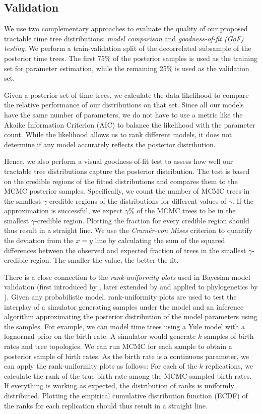 \documentclass[10pt,letterpaper]{article}
\begin{document}
\subsection*{Validation}

We use two complementary approaches to evaluate the quality of our proposed tractable time tree distributions: \emph{model comparison} and \emph{goodness-of-fit (GoF) testing}. We perform a train-validation split of the decorrelated subsample of the posterior time trees. The first 75\% of the posterior samples is used as the training set for parameter estimation, while the remaining 25\% is used as the validation set.

Given a posterior set of time trees, we calculate the data likelihood to compare the relative performance of our distributions on that set. Since all our models have the same number of parameters, we do not have to use a metric like the Akaike Information Criterion (AIC) to balance the likelihood with the parameter count. While the likelihood allows us to rank different models, it does not determine if any model accurately reflects the posterior distribution.

Hence, we also perform a visual goodness-of-fit test to assess how well our tractable tree distributions capture the posterior distribution. The test is based on the credible regions of the fitted distributions and compares them to the MCMC posterior samples. Specifically, we count the number of MCMC trees in the smallest $\gamma$-credible regions of the distributions for different values of $\gamma$. If the approximation is successful, we expect $\gamma$\% of the MCMC trees to be in the smallest $\gamma$-credible region. Plotting the fraction for every credible region should thus result in a straight line. We use the \emph{Cramér-von Mises} criterion \cite{cramarvonmises} to quantify the deviation from the $x=y$ line by calculating the sum of the squared differences between the observed and expected fraction of trees in the smallest $\gamma$-credible region. The smaller the value, the better the fit.

There is a close connection to the \emph{rank-uniformity plots} used in Bayesian model validation (first introduced by \cite{cook2006validation}, later extended by \cite{talts2018validating} and applied to phylogenetics by \cite{bayesianmodelvalidation}). Given any probabilistic model, rank-uniformity plots are used to test the interplay of a simulator generating samples under the model and an inference algorithm approximating the posterior distribution of the model parameters using the samples. For example, we can model time trees using a Yule model with a lognormal prior on the birth rate. A simulator would generate $k$ samples of birth rates and tree topologies. We can run MCMC for each sample to obtain a posterior sample of birth rates. As the birth rate is a continuous parameter, we can apply the rank-uniformity plots as follows: For each of the $k$ replications, we calculate the rank of the true birth rate among the MCMC-sampled birth rates. If everything is working as expected, the distribution of ranks is uniformly distributed. Plotting the empirical cumulative distribution function (ECDF) of the ranks for each replication should thus result in a straight line.
\end{document}

